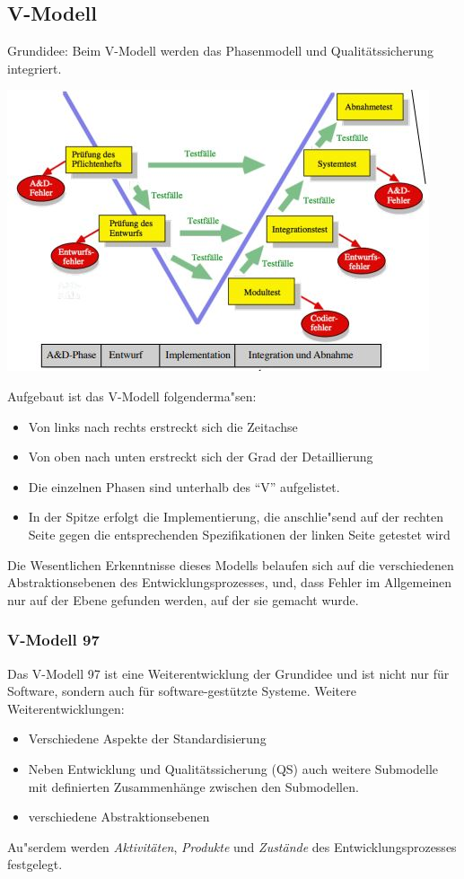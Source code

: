 \documentclass[a4paper,12pt]{article}
\begin{document}
	\subsection*{V-Modell}
	Grundidee: Beim V-Modell werden das Phasenmodell und Qualitätssicherung integriert.
	\begin{center}
		\includegraphics[width=\linewidth]{pics/vmodell.jpg}
	\end{center}
	Aufgebaut ist das V-Modell folgenderma"sen:
	\begin{itemize}
		\item Von links nach rechts erstreckt sich die Zeitachse
		\item Von oben nach unten erstreckt sich der Grad der Detaillierung
		\item Die einzelnen Phasen sind unterhalb des "`V"' aufgelistet.
		\item In der Spitze erfolgt die Implementierung, die anschlie"send auf der rechten Seite gegen die entsprechenden Spezifikationen der linken Seite getestet wird
	\end{itemize}
	Die Wesentlichen Erkenntnisse dieses Modells belaufen sich auf die verschiedenen Abstraktionsebenen des Entwicklungsprozesses, und, dass Fehler im Allgemeinen nur auf der Ebene gefunden werden, auf der sie gemacht wurde.
	
	\subsubsection*{V-Modell 97}
	Das V-Modell 97 ist eine Weiterentwicklung der Grundidee und ist nicht nur für Software, sondern auch für software-gestützte Systeme. Weitere Weiterentwicklungen:
	\begin{itemize}
		\item Verschiedene Aspekte der Standardisierung
		\item Neben Entwicklung und Qualitätssicherung (QS) auch weitere Submodelle mit definierten Zusammenhänge zwischen den Submodellen.
		\item verschiedene Abstraktionsebenen
	\end{itemize}
	Au"serdem werden \textit{Aktivitäten}, \textit{Produkte} und \textit{Zustände} des Entwicklungsprozesses festgelegt. \\
	
\end{document}
